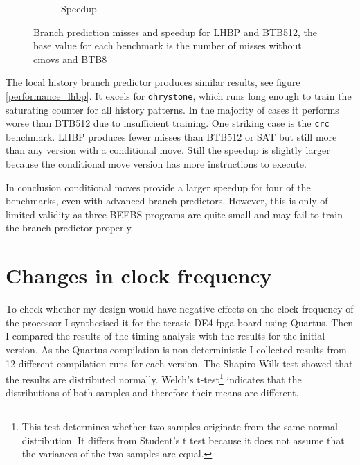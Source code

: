 \documentclass[12pt,twoside,notitlepage]{report}
\begin{document}
\begin{figure}[htp]
\begin{subfigure}[b]{\textwidth}
\caption{Speedup}
\end{subfigure}
\caption{Branch prediction misses and speedup for LHBP and BTB512, the base value for each benchmark is the number of misses without cmovs and BTB8}
\end{figure}


The local history branch predictor produces similar results, see figure \ref{performance_lhbp}. It excels for \texttt{dhrystone}, which runs long enough to train the saturating counter for all history patterns. In the majority of cases it performs worse than BTB512 due to insufficient training.
One striking case is the \texttt{crc} benchmark. LHBP produces fewer misses than BTB512 or SAT but still more than any version with a conditional move. Still the speedup is slightly larger because the conditional move version has more instructions to execute.

In conclusion conditional moves provide a larger speedup for four of the benchmarks, even with advanced branch predictors. However, this is only of limited validity as three BEEBS programs are quite small and may fail to train the branch predictor properly. 


\section{Changes in clock frequency}

To check whether my design would have negative effects on the clock frequency of the processor I synthesised it for the terasic DE4 \gls{fpga} board using Quartus. Then I compared the results of the timing analysis with the results for the initial version. As the Quartus compilation is non-deterministic I collected results from 12 different compilation runs for each version. The Shapiro-Wilk test \cite{shapiro1965analysis} showed that the results are distributed normally. Welch's t-test\footnote{This test determines whether two samples originate from the same normal distribution. It differs from Student's t test because it does not assume that the variances of the two samples are equal\cite{welch1947generalization}.} indicates that the distributions of both samples and therefore their means are different.
\end{document}
